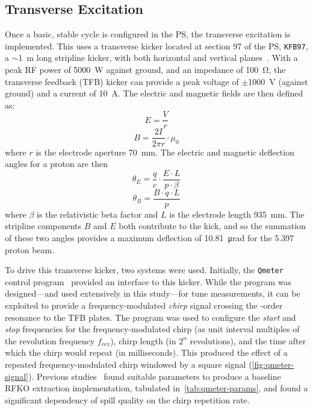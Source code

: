 \documentclass[a4paper,twoside,11pt]{report}
\begin{document}
\subsection{Transverse Excitation}\label{sec:trans_exc}
Once a basic, stable cycle is configured in the PS, the transverse excitation is implemented. This uses a transverse kicker located at section 97 of the PS, \verb|KFB97|, a $\sim$\qty{1}{\meter} long stripline kicker, with both horizontal and vertical planes~\cite{Sterbini:2158994}. With a peak RF power of \qty{5000}{\watt} against ground, and an impedance of \qty{100}{\ohm}, the transverse feedback (TFB) kicker can provide a peak voltage of $\pm$\qty{1000}{\volt} (against ground) and a current of \qty{10}{\ampere}. The electric and magnetic fields are then defined as:
\begin{equation}
  E=\frac Vr
\end{equation}
\begin{equation}
  B=\frac {2I}{2\pi r}\cdot \mu_0
\end{equation}
where $r$ is the electrode aperture \qty{70}{\milli\meter}. The electric and magnetic deflection angles for a proton are then~\cite[3.1-3.2]{bouvet}
\begin{equation}
  \theta_E = \frac qc \cdot \frac{E \cdot L}{p\cdot\beta}
  \label{eq:kick-electric}
\end{equation}
\begin{equation}
  \theta_B = \frac{B\cdot q\cdot L}{p}
  \label{eq:kick-magnetic}
\end{equation} where $\beta$ is the relativistic beta factor and $L$ is the electrode length \qty{935}{\milli\meter}. The stripline components $B$ and $E$ both contribute to the kick, and so the summation of these two angles provides a maximum deflection of \qty{10.81}{\micro\radian} for the \qty{5.397}{\giga\eVperc} proton beam.

To drive this transverse kicker, two systems were used. Initially, the \verb|Qmeter| control program~\cite{Gasior:895142} provided an interface to this kicker. While the program was designed---and used extensively in this study---for tune measurements, it can be exploited to provide a frequency-modulated \textit{chirp} signal crossing the -order resonance to the TFB plates. The program was used to configure the \textit{start} and \textit{stop} frequencies for the frequency-modulated chirp (as unit interval multiples of the revolution frequency $f_{rev}$), chirp length (in $2^n$ revolutions), and the time after which the chirp would repeat (in milliseconds). This produced the effect of a repeated frequency-modulated chirp windowed by a square signal (\autoref{fig:qmeter-signal}). Previous studies~\cite{ipac} found suitable parameters to produce a baseline RFKO extraction implementation, tabulated in~\autoref{tab:qmeter-params}, and found a significant dependency of spill quality on the chirp repetition rate.
\end{document}
